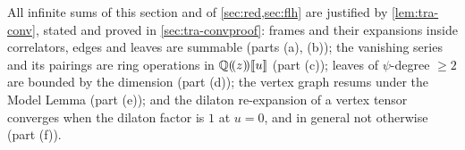 
All infinite sums of this section and of \cref{sec:red,sec:flh} are justified by \cref{lem:tra-conv}, stated and proved in \cref{sec:tra-convproof}: frames and their expansions inside correlators, edges and leaves are summable (parts (a), (b)); the vanishing series and its pairings are ring operations in $\mathbb{Q}(\!(z)\!)[\![ u ]\!]$ (part (c)); leaves of $\psi$-degree $\geq 2$ are bounded by the dimension (part (d)); the vertex graph resums under the Model Lemma (part (e)); and the dilaton re-expansion of a vertex tensor converges when the dilaton factor is $1$ at $u = 0$, and in general not otherwise (part (f)).


